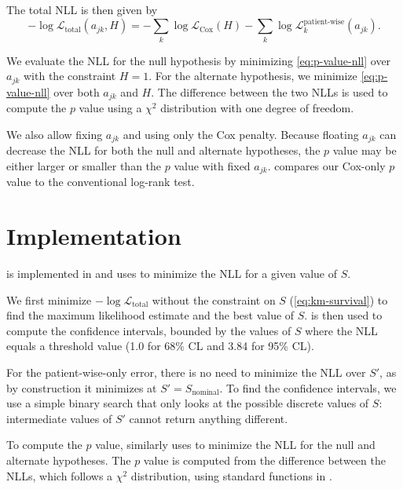 \documentclass[article]{jss}
\begin{document}
The total NLL is then given by
\begin{equation}
-\log \mathcal{L}_{\text{total}}(a_{jk}, H) = -\sum_{k}\log\mathcal{L}_\text{Cox}(H) - \sum_{k}\log\mathcal{L}_k^{\text{patient-wise}}(a_{jk}).
\label{eq:p-value-nll}
\end{equation}

We evaluate the NLL for the null hypothesis by minimizing \cref{eq:p-value-nll} over \(a_{jk}\) with the constraint \(H=1\). For the alternate hypothesis, we minimize \cref{eq:p-value-nll} over both \(a_{jk}\) and \(H\). The difference between the two NLLs is used to compute the \(p\) value using a \(\chi^2\) distribution with one degree of freedom.

We also allow fixing \(a_{jk}\) and using only the Cox penalty. Because floating \(a_{jk}\) can decrease the NLL for both the null and alternate hypotheses, the \(p\) value may be either larger or smaller than the \(p\) value with fixed \(a_{jk}\).  compares our Cox-only \(p\) value to the conventional log-rank test.

\section{Implementation}

 is implemented in  and uses  \citep{gurobi} to minimize the NLL for a given value of \(S\).

We first minimize \(-\log \mathcal{L}_{\text{total}}\) without the constraint on \(S\) (\ref{eq:km-survival}) to find the maximum likelihood estimate and the best value of \(S\)\@.  \citep{brentq,scipy} is then used to compute the confidence intervals, bounded by the values of \(S\) where the NLL equals a threshold value (1.0 for 68\% CL and 3.84 for 95\% CL).

For the patient-wise-only error, there is no need to minimize the NLL over \(S'\), as by construction it minimizes at \(S'=S_\text{nominal}\). To find the confidence intervals, we use a simple binary search that only looks at the possible discrete values of \(S\): intermediate values of \(S'\) cannot return anything different.

To compute the \(p\) value,  similarly uses  to minimize the NLL for the null and alternate hypotheses. The \(p\) value is computed from the difference between the NLLs, which follows a \(\chi^2\) distribution, using standard functions in .
\end{document}
